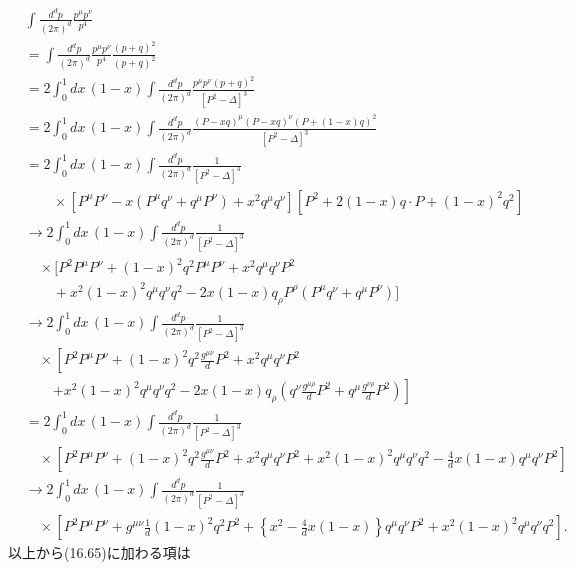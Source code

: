 \begin{align*}
  & \int \frac{d^dp}{(2\pi)^d} \frac{p^\mu p^\nu}{p^4} \\
  &= \int \frac{d^dp}{(2\pi)^d} \frac{p^\mu p^\nu}{p^4} \frac{(p+q)^2}{(p+q)^2} \\
  &= 2 \int_0^1 dx \, (1-x) \int \frac{d^dp}{(2\pi)^d} \frac{p^\mu p^\nu (p+q)^2}{[P^2-\Delta]^3} \\
  &= 2 \int_0^1 dx \, (1-x) \int \frac{d^dp}{(2\pi)^d} \frac{(P-xq)^\mu (P-xq)^\nu (P+(1-x)q)^2}{[P^2-\Delta]^3} \\
  &= 2 \int_0^1 dx \, (1-x) \int \frac{d^dp}{(2\pi)^d} \frac{1}{[P^2-\Delta]^3} \\
  &\qquad\times \left[ P^\mu P^\nu - x(P^\mu q^\nu+q^\mu P^\nu) + x^2 q^\mu q^\nu \right]
  [P^2 + 2(1-x)q \cdot P + (1-x)^2 q^2]  \\
  &\to 2 \int_0^1 dx \, (1-x) \int \frac{d^dp}{(2\pi)^d} \frac{1}{[P^2-\Delta]^3} \\
  &\quad\times \bigl[ P^2 P^\mu P^\nu + (1-x)^2 q^2 P^\mu P^\nu + x^2 q^\mu q^\nu P^2 \\
  & \qquad + x^2(1-x)^2 q^\mu q^\nu q^2 - 2x(1-x) q_\rho P^\rho (P^\mu q^\nu+q^\mu P^\nu) \bigr] \\
  &\to 2 \int_0^1 dx \, (1-x) \int \frac{d^dp}{(2\pi)^d} \frac{1}{[P^2-\Delta]^3} \\
  &\quad\times \left[ P^2 P^\mu P^\nu + (1-x)^2 q^2 \frac{g^{\mu\nu}}{d} P^2 + x^2 q^\mu q^\nu P^2 \right. \\
  & \qquad \left. + x^2(1-x)^2 q^\mu q^\nu q^2 - 2x(1-x) q_\rho \left( q^\nu \frac{g^{\mu\rho}}{d} P^2 + q^\mu \frac{g^{\nu\rho}}{d} P^2 \right) \right] \\
  &= 2 \int_0^1 dx \, (1-x) \int \frac{d^dp}{(2\pi)^d} \frac{1}{[P^2-\Delta]^3} \\
  &\quad\times \left[ P^2 P^\mu P^\nu + (1-x)^2 q^2 \frac{g^{\mu\nu}}{d} P^2 + x^2 q^\mu q^\nu P^2
  + x^2(1-x)^2 q^\mu q^\nu q^2 - \frac{4}{d}x(1-x) q^\mu q^\nu P^2 \right] \\
  &\to 2 \int_0^1 dx \, (1-x) \int \frac{d^dp}{(2\pi)^d} \frac{1}{[P^2-\Delta]^3} \\
  &\quad\times \left[ P^2 P^\mu P^\nu + g^{\mu\nu} \frac{1}{d} (1-x)^2 q^2 P^2
  + \left\{ x^2 - \frac{4}{d}x(1-x) \right\} q^\mu q^\nu P^2
  + x^2(1-x)^2 q^\mu q^\nu q^2 \right] .
\end{align*}
以上から(16.65)に加わる項は
